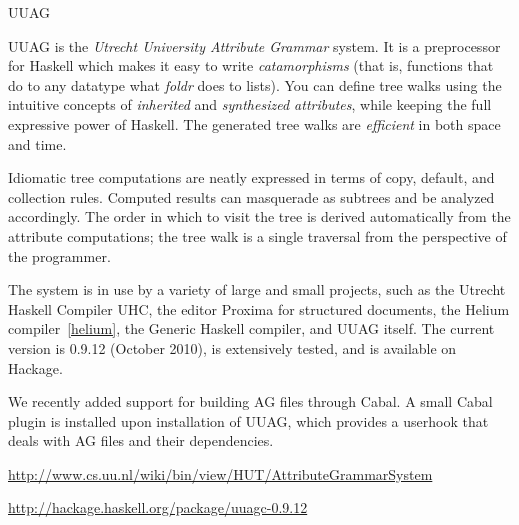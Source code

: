 \begin{hcarentry}[updated]{UUAG}
\makeheader

UUAG is the \emph{Utrecht University Attribute Grammar} system. It is a preprocessor for Haskell which makes it easy to write \emph{catamorphisms} (that is, functions that do to any datatype what \emph{foldr} does to lists). You can define tree walks using the intuitive concepts of \emph{inherited} and \emph{synthesized attributes}, while keeping the full expressive power of Haskell. The generated tree walks are \emph{efficient} in both space and time.

Idiomatic tree computations are neatly expressed in terms of copy, default, and collection rules. Computed results can masquerade as subtrees and be analyzed accordingly. The order in which to visit the tree is derived automatically from the attribute computations; the tree walk is a single traversal from the perspective of the programmer.

The system is in use by a variety of large and small projects, such as the Utrecht Haskell Compiler UHC, the editor Proxima for structured documents, the Helium compiler~\cref{helium}, the Generic Haskell compiler, and UUAG itself. The current version is 0.9.12 (October 2010), is extensively tested, and is available on Hackage.

We recently added support for building AG files through Cabal. A small Cabal plugin is installed upon installation of UUAG, which provides a userhook that deals with AG files and their dependencies.

\FurtherReading
\begin{compactitem}
\item
  \url{http://www.cs.uu.nl/wiki/bin/view/HUT/AttributeGrammarSystem}
\item
  \url{http://hackage.haskell.org/package/uuagc-0.9.12}
\end{compactitem}
\end{hcarentry}
